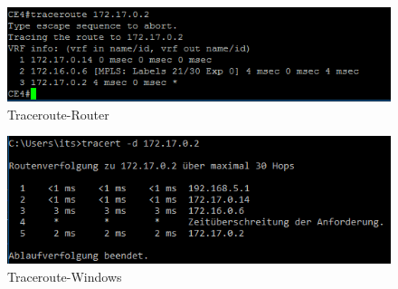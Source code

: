 \begin{figure}[H]
	\centering
	\includegraphics[width=1.0\textwidth]{data/traceroute_router.PNG}
	\caption{Traceroute-Router}
	\label{img:trace_router}
\end{figure}

\begin{figure}[H]
	\centering
	\includegraphics[width=1.0\textwidth]{data/traceroute_windows2.PNG}
	\caption{Traceroute-Windows}
	\label{img:trace_win}
\end{figure}